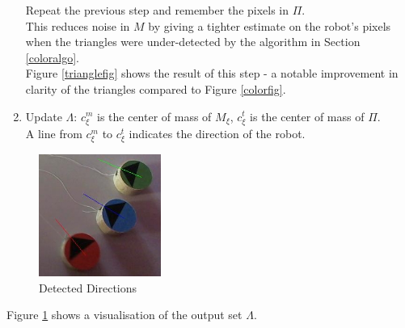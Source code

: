\documentclass[10pt,a4paper]{article}
\begin{document}
\begin{enumerate}
    Repeat the previous step and remember the pixels in $\Pi$. \\
    This reduces noise in $M$ by giving a tighter estimate on the robot's
    pixels when the triangles were under-detected by the algorithm in 
    Section \ref{coloralgo}. \\
    Figure \ref{trianglefig} shows the result of this step - a notable
    improvement in clarity of the triangles compared to Figure \ref{colorfig}.
    \item
    Update $\Lambda$: $c^m_\xi$ is the center of mass of $M_\xi$, $c^t_\xi$ is 
    the center of mass of $\Pi$. \\
    A line from $c^m_\xi$ to $c^t_\xi$ indicates the direction of the robot.
\end{enumerate} 
\begin{figure}[ht]
    \centering
    \includegraphics[width=40mm]{d1_i5_result.jpg}
    \caption{Detected Directions}
    \label{directionfig}
\end{figure} 
Figure \ref{directionfig} shows a visualisation of the output set $\Lambda$.
\end{document}
